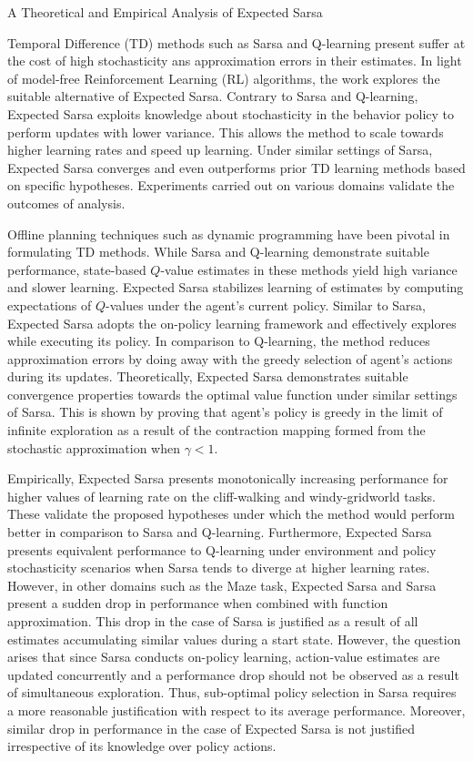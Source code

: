 \documentclass[11pt,letterpaper]{article}
\begin{document}
\begin{center}
  \large{A Theoretical and Empirical Analysis of Expected Sarsa}
\end{center}

Temporal Difference (TD) methods such as Sarsa and Q-learning present suffer at the cost of high stochasticity ans approximation errors in their estimates. In light of model-free Reinforcement Learning (RL) algorithms, the work explores the suitable alternative of Expected Sarsa. Contrary to Sarsa and Q-learning, Expected Sarsa exploits knowledge about stochasticity in the behavior policy to perform updates with lower variance. This allows the method to scale towards higher learning rates and speed up learning. Under similar settings of Sarsa, Expected Sarsa converges and even outperforms prior TD learning methods based on specific hypotheses. Experiments carried out on various domains validate the outcomes of analysis.

Offline planning techniques such as dynamic programming have been pivotal in formulating TD methods. While Sarsa and Q-learning demonstrate suitable performance, state-based $Q$-value estimates in these methods yield high variance and slower learning. Expected Sarsa stabilizes learning of estimates by computing expectations of $Q$-values under the agent's current policy. Similar to Sarsa, Expected Sarsa adopts the on-policy learning framework and effectively explores while executing its policy. In comparison to Q-learning, the method reduces approximation errors by doing away with the greedy selection of agent's actions during its updates. Theoretically, Expected Sarsa demonstrates suitable convergence properties towards the optimal value function under similar settings of Sarsa. This is shown by proving that agent's policy is greedy in the limit of infinite exploration as a result of the contraction mapping formed from the stochastic approximation when $\gamma < 1$. 

Empirically, Expected Sarsa presents monotonically increasing performance for higher values of learning rate on the cliff-walking and windy-gridworld tasks. These validate the proposed hypotheses under which the method would perform better in comparison to Sarsa and Q-learning. Furthermore, Expected Sarsa presents equivalent performance to Q-learning under environment and policy stochasticity scenarios when Sarsa tends to diverge at higher learning rates. However, in other domains such as the Maze task, Expected Sarsa and Sarsa present a sudden drop in performance when combined with function approximation. This drop in the case of Sarsa is justified as a result of all estimates accumulating similar values during a start state. However, the question arises that since Sarsa conducts on-policy learning, action-value estimates are updated concurrently and a performance drop should not be observed as a result of simultaneous exploration. Thus, sub-optimal policy selection in Sarsa requires a more reasonable justification with respect to its average performance. Moreover, similar drop in performance in the case of Expected Sarsa is not justified irrespective of its knowledge over policy actions. 
\end{document}
